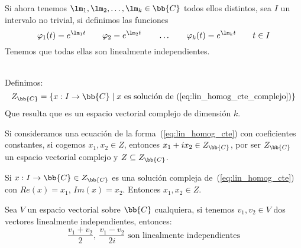 \begin{observacion}
    Si ahora tenemos $\lm_1,\lm_2,\ldots,\lm_k\in \bb{C}$ todos ellos distintos, sea $I$ un intervalo no trivial, si definimos las funciones
    \begin{equation*}
        \varphi_1(t) = e^{\lm_1t} \qquad \varphi_2=e^{\lm_2 t} \qquad \ldots \qquad \varphi_k(t) = e^{\lm_kt} \qquad t\in I
    \end{equation*}
    Tenemos que todas ellas son linealmente independientes.
\end{observacion}~\\

\noindent
Definimos:
\begin{equation*}
    Z_{\bb{C}} = \{x:I\rightarrow\bb{C} \mid x \text{\ es solución de~(\ref{eq:lin_homog_cte_complejo})}\}
\end{equation*}
Que resulta que es un espacio vectorial complejo de dimensión $k$.\\

\begin{observacion}
    Si consideramos una ecuación de la forma~(\ref{eq:lin_homog_cte}) con coeficientes constantes, si cogemos $x_1,x_2\in Z$, entonces $x_1 + ix_2 \in Z_{\bb{C}}$, por ser $Z_{\bb{C}}$ un espacio vectorial complejo y $Z\subseteq Z_{\bb{C}}$.\\

\end{observacion}

\begin{prop}
    Si $x:I\rightarrow\bb{C}\in Z_{\bb{C}}$ es una solución compleja de~(\ref{eq:lin_homog_cte}) con $Re(x) = x_1$, $Im(x)=x_2$. Entonces $x_1,x_2\in Z$.
\end{prop}

\begin{observacion}
    Sea $V$ un espacio vectorial sobre $\bb{C}$ cualquiera, si tenemos $v_1,v_2\in V$ dos vectores linealmente independientes, entonces:
    \begin{equation*}
        \dfrac{v_1+v_2}{2},\ \dfrac{v_1-v_2}{2i} \text{\ son linealmente independientes}
    \end{equation*}
\end{observacion}

